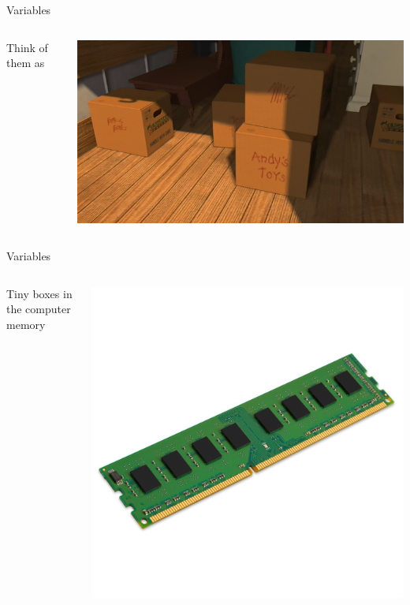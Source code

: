 		\begin{frame}{Variables}
			\begin{columns}[T]
				\begin{column}{0.2\textwidth}
					\centering
					Think of them as
					\pause					
				\end{column}
				\begin{column}{0.8\textwidth}
					\centering
					\includegraphics[width=\textwidth]{images/box.png}
				\end{column}
			\end{columns}
		\end{frame}
		
		\begin{frame}{Variables}
			\begin{columns}[T]
				\begin{column}{0.6\textwidth}
					\centering
					Tiny boxes in the computer memory
					\pause					
				\end{column}
				\begin{column}{0.4\textwidth}
					\centering
					\includegraphics[width=\textwidth]{images/memory.jpg}
				\end{column}
			\end{columns}
		\end{frame}
		
